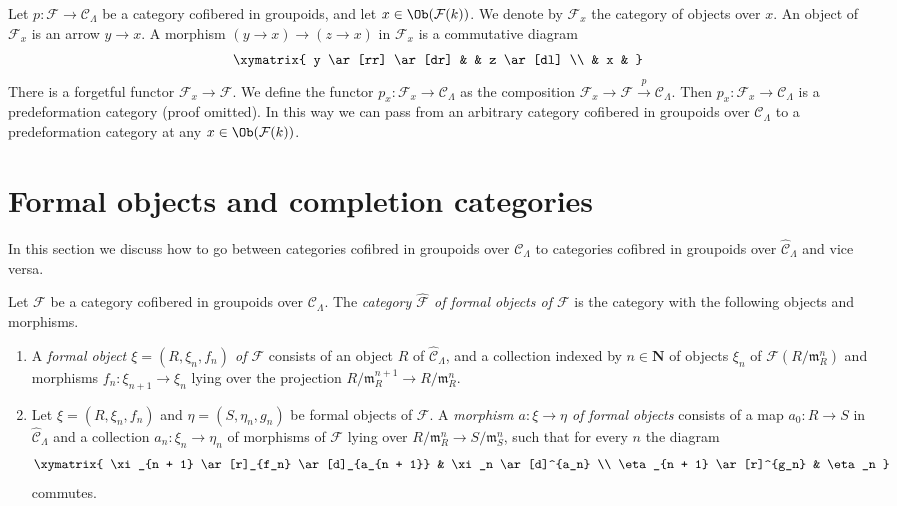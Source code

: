\begin{remark}
\label{remark-localize-cofibered-groupoid}
Let $p : \mathcal{F} \to \mathcal{C}_\Lambda$ be a category cofibered in
groupoids, and let $x \in \Ob(\mathcal{F}(k))$.  We denote by
$\mathcal{F}_x$ the category of objects over $x$.
An object of $\mathcal{F}_x$ is an arrow $y \to x$.
A morphism $(y \to x) \to (z \to x)$ in $\mathcal{F}_x$ is a commutative
diagram
$$
\xymatrix{
y \ar[rr] \ar[dr] & & z \ar[dl] \\
& x &
}
$$
There is a forgetful functor $\mathcal{F}_x \to \mathcal{F}$. We define
the functor $p_x : \mathcal{F}_x \to \mathcal{C}_\Lambda$ as the
composition
$\mathcal{F}_x \to \mathcal{F} \xrightarrow{p} \mathcal{C}_\Lambda$.
Then $p_x : \mathcal{F}_x \to \mathcal{C}_\Lambda$ is a
predeformation category (proof omitted). In this way we can pass from an
arbitrary category cofibered in groupoids over $\mathcal{C}_\Lambda$
to a predeformation category at any $x \in \Ob(\mathcal{F}(k))$.
\end{remark}






\section{Formal objects and completion categories}
\label{section-formal-objects}

\noindent
In this section we discuss how to go between categories cofibred in
groupoids over $\mathcal{C}_\Lambda$ to categories cofibred in
groupoids over $\widehat{\mathcal{C}}_\Lambda$ and vice versa.

\begin{definition}
\label{definition-formal-objects}
Let $\mathcal{F}$ be a category cofibered in groupoids over
$\mathcal{C}_\Lambda$. The {\it category $\widehat{\mathcal{F}}$ of formal
objects of  $\mathcal{F}$} is the category with the following objects and
morphisms.
\begin{enumerate}
\item A {\it formal object $\xi = (R, \xi_n, f_n)$ of $\mathcal{F}$}
consists of an object $R$ of $\widehat{\mathcal{C}}_\Lambda$, and a collection
indexed by $n \in \mathbf{N}$ of objects $\xi_n$ of
$\mathcal{F}(R/\mathfrak m_R^n)$ and morphisms
$f_n : \xi_{n + 1} \to \xi_n$ lying over the projection
$R/\mathfrak m_R^{n + 1} \to R/\mathfrak m_R^n$.
\item Let $\xi = (R, \xi_n, f_n)$ and $\eta = (S, \eta_n, g_n)$ be
formal objects of $\mathcal{F}$.  A {\it morphism $a : \xi \to \eta$ of
formal objects} consists of a map $a_0 : R \to S$ in
$\widehat{\mathcal{C}}_\Lambda$ and a collection $a_n : \xi_n \to \eta_n$
of morphisms of $\mathcal{F}$ lying over
$R/\mathfrak m_R^n \to S/\mathfrak m_S^n$,
such that for every $n$ the diagram
$$
\xymatrix{
\xi_{n + 1} \ar[r]_{f_n} \ar[d]_{a_{n + 1}} & \xi_n \ar[d]^{a_n} \\
\eta_{n + 1} \ar[r]^{g_n} & \eta_n
}
$$
commutes.
\end{enumerate}
\end{definition}

